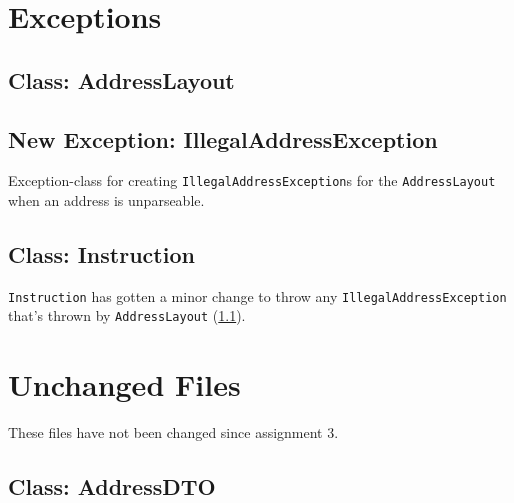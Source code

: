 \documentclass[a4paper]{scrreprt}
\begin{document}


\section{Exceptions}

\subsection{Class: AddressLayout}
\label{subsec:addresslayout.java}



\subsection{New Exception: IllegalAddressException}
\label{subsec:illegaladdressexception.java}

Exception-class for creating \texttt{IllegalAddressException}s for the \texttt{AddressLayout} when an address is unparseable.



\subsection{Class: Instruction}
\label{subsec:instruction.java}

\texttt{Instruction} has gotten a minor change to throw any \texttt{IllegalAddressException} that's thrown by \texttt{AddressLayout} (\ref{subsec:addresslayout.java}).



\section{Unchanged Files}
\label{sec:user}

These files have not been changed since assignment 3.

\subsection{Class: AddressDTO}
\label{subsec:addressdto.java}


\end{document}
